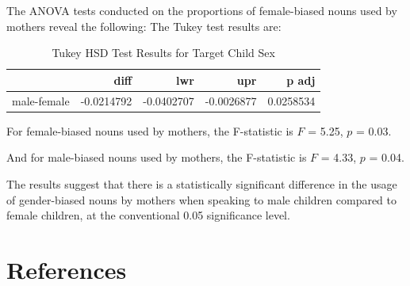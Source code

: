 \documentclass[
  man]{apa6}
\begin{document}
The ANOVA tests conducted on the proportions of female-biased nouns used by mothers reveal the following:
The Tukey test results are:

\begin{table}

\caption{\label{tab:unnamed-chunk-8}Tukey HSD Test Results for Target Child Sex}
\centering
\begin{tabular}[t]{l|r|r|r|r}
\hline
  & diff & lwr & upr & p adj\\
\hline
male-female & -0.0214792 & -0.0402707 & -0.0026877 & 0.0258534\\
\hline
\end{tabular}
\end{table}

For female-biased nouns used by mothers, the F-statistic is \(F\) = 5.25, \(p\) = 0.03.

And for male-biased nouns used by mothers, the F-statistic is \(F\) = 4.33, \(p\) = 0.04.

The results suggest that there is a statistically significant difference in the usage of gender-biased nouns by mothers when speaking to male children compared to female children, at the conventional 0.05 significance level.

\newpage

\hypertarget{references}{%
\section{References}\label{references}}

\begingroup
\setlength{\parindent}{-0.5in}
\setlength{\leftskip}{0.5in}
\end{document}
